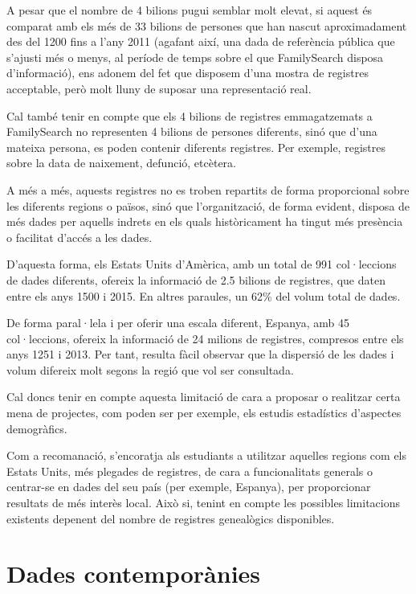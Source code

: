     A pesar que el nombre de 4 bilions pugui semblar molt elevat, si aquest és comparat amb els més de 33 bilions de persones que han nascut aproximadament des del 1200 fins a l'any 2011 (agafant així, una dada de referència pública que s'ajusti més o menys, al període de temps sobre el que FamilySearch disposa d'informació), ens adonem del fet que disposem d'una mostra de registres acceptable, però molt lluny de suposar una representació real.

    Cal també tenir en compte que els 4 bilions de registres emmagatzemats a Family\-Search no representen 4 bilions de persones diferents, sinó que d’una mateixa persona, es poden contenir diferents registres. Per exemple, registres sobre la data de naixement, defunció, etcètera.

    A més a més, aquests registres no es troben repartits de forma proporcional sobre les diferents regions o països, sinó que l'organització, de forma evident, disposa de més dades per aquells indrets en els quals històricament ha tingut més presència o facilitat d'accés a les dades.

     D'aquesta forma, els Estats Units d'Amèrica, amb un total de 991 col·leccions de dades diferents, ofereix la informació de 2.5 bilions de registres, que daten entre els anys 1500 i 2015. En altres paraules, un 62\% del volum total de dades.

     De forma paral·lela i per oferir una escala diferent, Espanya, amb 45 col·leccions, ofereix la informació de 24 milions de registres, compresos entre els anys 1251 i 2013. Per tant, resulta fàcil observar que la dispersió de les dades i volum difereix molt segons la regió que vol ser consultada.

     Cal doncs tenir en compte aquesta limitació de cara a proposar o realitzar certa mena de projectes, com poden ser per exemple, els estudis estadístics d'aspectes demogràfics.

     Com a recomanació, s'encoratja als estudiants a utilitzar aquelles regions com els Estats Units, més plegades de registres, de cara a funcionalitats generals o centrar-se en dades del seu país (per exemple, Espanya), per proporcionar resultats de més interès local. Això si, tenint en compte les possibles limitacions existents depenent del nombre de registres genealògics disponibles.


 \section{Dades contemporànies}

